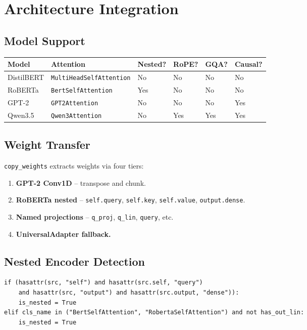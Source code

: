 \section{Architecture Integration}

\subsection{Model Support}

\begin{table}[H]
\centering
\small
\begin{tabular}{llllll}
\toprule
\textbf{Model} & \textbf{Attention} & \textbf{Nested?} & \textbf{RoPE?} & \textbf{GQA?} & \textbf{Causal?} \\
\midrule
DistilBERT & \texttt{MultiHeadSelfAttention} & No & No & No & No \\
RoBERTa & \texttt{BertSelfAttention} & Yes & No & No & No \\
GPT-2 & \texttt{GPT2Attention} & No & No & No & Yes \\
Qwen3.5 & \texttt{Qwen3Attention} & No & Yes & Yes & Yes \\
\bottomrule
\end{tabular}
\end{table}

\subsection{Weight Transfer}

\texttt{copy\_weights} extracts weights via four tiers:

\begin{enumerate}
\item \textbf{GPT-2 Conv1D} -- transpose and chunk.
\item \textbf{RoBERTa nested} -- \texttt{self.query}, \texttt{self.key}, \texttt{self.value}, \texttt{output.dense}.
\item \textbf{Named projections} -- \texttt{q\_proj}, \texttt{q\_lin}, \texttt{query}, etc.
\item \textbf{UniversalAdapter fallback.}

\end{enumerate}
\subsection{Nested Encoder Detection}

\begin{lstlisting}
if (hasattr(src, "self") and hasattr(src.self, "query")
    and hasattr(src, "output") and hasattr(src.output, "dense")):
    is_nested = True
elif cls_name in ("BertSelfAttention", "RobertaSelfAttention") and not has_out_lin:
    is_nested = True
\end{lstlisting}

